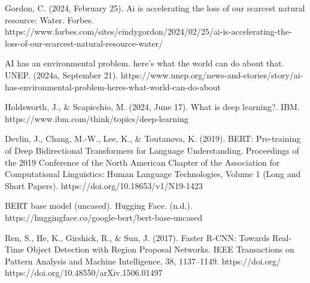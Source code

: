 \documentclass[licencjacka,en]{pracamgr}
\begin{document}
\begin{thebibliography}{99}
Gordon, C. (2024, February 25). Ai is accelerating the loss of our scarcest natural resource: Water. Forbes. https://www.forbes.com/sites/cindygordon/2024/02/25/ai-is-accelerating-the-loss-of-our-scarcest-natural-resource-water/

AI has an environmental problem. here’s what the world can do about that. UNEP. (2024a, September 21). https://www.unep.org/news-and-stories/story/ai-has-environmental-problem-heres-what-world-can-do-about

Holdsworth, J., \& Scapicchio, M. (2024, June 17). What is deep learning?. IBM. https://www.ibm.com/think/topics/deep-learning

Devlin, J., Chang, M.-W., Lee, K., \& Toutanova, K. (2019). BERT: Pre-training of Deep Bidirectional Transformers for Language Understanding. Proceedings of the 2019 Conference of the North {A}merican Chapter of the Association for Computational Linguistics: Human Language Technologies, Volume 1 (Long and Short Papers). https://doi.org/10.18653/v1/N19-1423

BERT base model (uncased).  Hugging Face. (n.d.). https://huggingface.co/google-bert/bert-base-uncased

Ren, S., He, K., Girshick, R., \& Sun, J. (2017). Faster R-CNN: Towards Real-Time Object Detection with Region Proposal Networks. IEEE Transactions on Pattern Analysis and Machine Intelligence, 38, 1137–1149. https://doi.org/ https://doi.org/10.48550/arXiv.1506.01497


\end{thebibliography}
\end{document}
